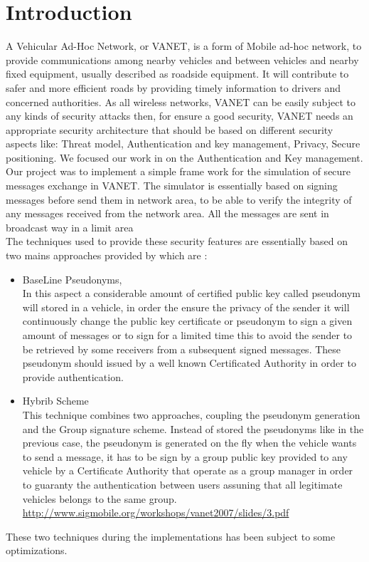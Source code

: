 \section{Introduction}
A Vehicular Ad-Hoc Network, or VANET, is a form of Mobile ad-hoc network, to provide communications among nearby vehicles and between vehicles and nearby fixed equipment, usually described as roadside equipment. It will contribute to safer and more efficient roads by providing timely information to drivers and concerned authorities.
As all wireless networks, VANET can be easily subject to any kinds of security  attacks then, for ensure a good security, VANET needs an appropriate security architecture that should be based on different security aspects like: Threat model, Authentication and key management, Privacy, Secure positioning. We focused our work in on the  Authentication and Key management.\\
Our project was to implement a simple frame work for the simulation of secure messages exchange in VANET. The simulator is essentially based on  signing  messages before send them in network area, to be able to verify the integrity of any messages received from the network area. All the messages are sent in broadcast way in a limit area\\
The techniques used to provide these security features are essentially based on two mains approaches provided
 by\cite{calandriello} which are :
\begin{itemize}
\item BaseLine Pseudonyms,\\
In this aspect a considerable amount of certified public key called pseudonym  will stored in a vehicle, in order the ensure the privacy of the sender it will continuously change the public key certificate or pseudonym to sign a given amount of messages or to sign for a limited time this to avoid the sender to be retrieved by some receivers from a subsequent signed messages. These pseudonym should issued by a well known Certificated Authority in order to provide authentication.

\item Hybrib Scheme\\
This technique combines two approaches, coupling the pseudonym generation and the Group signature scheme.
Instead of stored the pseudonyms like in the previous case, the pseudonym  is generated on the fly when the vehicle wants to send a message, it has to be sign by a group public key provided to any vehicle by a Certificate Authority that operate as a group manager in order to guaranty the authentication between users assuning that all legitimate vehicles belongs to the same group.
\\
\url{http://www.sigmobile.org/workshops/vanet2007/slides/3.pdf}
\end{itemize}
These two techniques during the implementations has been subject to some optimizations.

